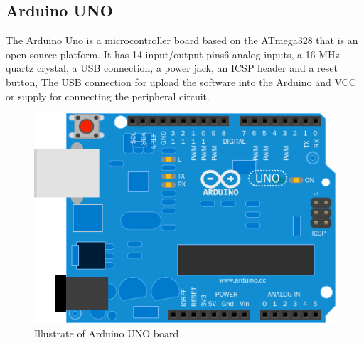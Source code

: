 \subsection{Arduino UNO\cite{ref14}}

\hspace{1.5cm} The Arduino Uno is a microcontroller board based on the ATmega328 that is an open source platform. It has 14 input/output pins6 analog inputs, a 16 MHz quartz crystal, a USB connection, a power jack, an ICSP header and a reset button, The USB connection for upload the software into the Arduino and VCC or supply for connecting the peripheral circuit.   
\begin{figure}[ht]
	\centering
	\includegraphics[scale = 0.8]{chapter3/38.pdf}
	\caption{Illustrate of Arduino UNO board}
\end{figure}


